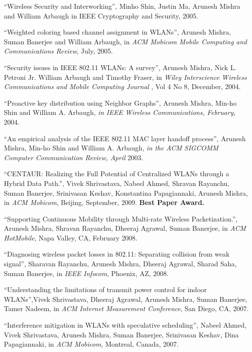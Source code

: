 \begin{resume}
\mybullet ``Wireless Security and Interworking'', Minho Shin, Justin Ma, Arunesh Mishra and William Arbaugh in IEEE Cryptography and Security, 2005.

\mybullet ``Weighted coloring based channel assignment in WLANs'', Arunesh Mishra, Suman Banerjee and William Arbaugh,
in {\em ACM Mobicom Mobile Computing and Communications Review}, July, 2005.

\mybullet ``Security issues in IEEE 802.11 WLANs: A survey'', Arunesh Mishra, Nick L. Petroni Jr. William Arbaugh and Timothy Fraser, 
in {\em  Wiley Interscience Wireless Communications and Mobile Computing Journal }, Vol 4 No 8, December, 2004.

\mybullet ``Proactive key distribution using Neighbor Graphs'', Arunesh Mishra,  Min-ho Shin and William A. Arbaugh,
{\em in IEEE Wireless Communications, February,} 2004.

\mybullet ``An empirical analysis of the IEEE 802.11 MAC layer handoff process'', Arunesh Mishra,  
Min-ho Shin and William A. Arbaugh, {\em in the ACM SIGCOMM Computer Communication Review, April} 2003. 

\vspace{-0.7cm}

\mybullet ``CENTAUR: Realizing the Full Potential of Centralized WLANs through a Hybrid Data Path.'', Vivek Shrivastava, Nabeel Ahmed, Shravan Rayanchu, Suman Banerjee, Srinivasan Keshav, Konstantina Papagiannaki, Arunesh Mishra,
in {\it ACM Mobicom}, Beijing, September, 2009. {\bf Best Paper Award.}

\mybullet ``Supporting Continuous Mobility through Multi-rate Wireless Packetization.'', Arunesh Mishra, Shravan Rayanchu, Dheeraj Agrawal, Suman Banerjee, 
in {\it ACM HotMobile}, Napa Valley, CA, February 2008.

\mybullet ``Diagnosing wireless packet losses in 802.11: Separating collision from weak signal'', Sharavan Rayanchu, Arunesh Mishra, Dheeraj Agrawal, Sharad Saha,
Suman Banerjee, in {\it IEEE Infocom}, Phoenix, AZ, 2008.

\mybullet ``Understanding the limitations of transmit power control for indoor WLANs'',Vivek Shrivastava, Dheeraj Agrawal, Arunesh Mishra, Suman Banerjee, Tamer Nadeem, in {\it ACM Internet Measurement Conference}, San Diego, CA, 2007.

\mybullet ``Interference mitigation in WLANs with speculative scheduling'', Nabeel Ahmed, Vivek Shrivastava, Arunesh Mishra,
   Suman Banerjee, Srinivasan Keshav, Dina Papagiannaki, in  {\it ACM Mobicom}, Montreal, Canada, 2007.


\end{resume}
